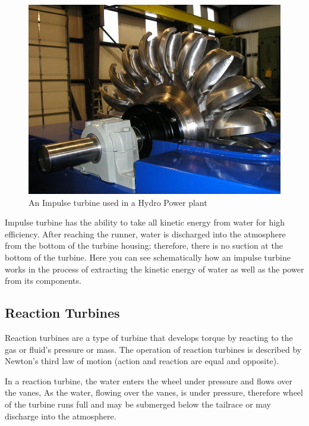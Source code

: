 \documentclass[11pt]{article}
\begin{document}
\begin{figure}[H]
	\centering
	\includegraphics[scale=0.5]{impulse turbine hydro.jpg}
	\caption{An Impulse turbine used in a Hydro Power plant}
	\label{it}
\end{figure}

Impulse turbine has the ability to take all kinetic energy from water for high efficiency. After reaching the runner, water is discharged into the atmosphere from the bottom of the turbine housing; therefore, there is no suction at the bottom of the turbine. Here you can see schematically how an impulse turbine works in the process of extracting the kinetic energy of water as well as the power from its components.

\subsection{Reaction Turbines}

Reaction turbines are a type of turbine that develops torque by reacting to the gas or fluid’s pressure or mass. The operation of reaction turbines is described by Newton’s third law of motion (action and reaction are equal and opposite).

In a reaction turbine, the water enters the wheel under pressure and flows over the vanes, As the water, flowing over the vanes, is under pressure, therefore wheel of the turbine runs full and may be submerged below the tailrace or may discharge into the atmosphere.\\
\end{document}
